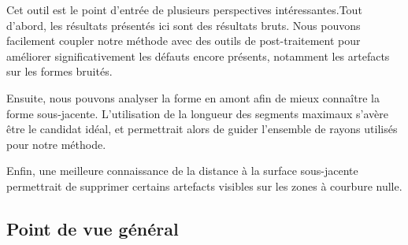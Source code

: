Cet outil est le point d'entrée de plusieurs perspectives intéressantes.Tout
d'abord, les résultats présentés ici sont des résultats bruts. Nous pouvons
facilement coupler notre méthode avec des outils de post-traitement pour
améliorer significativement les défauts encore présents, notamment les artefacts
sur les formes bruités.


Ensuite, nous pouvons analyser la forme en amont afin de mieux connaître la
forme sous-jacente. L'utilisation de la longueur des segments maximaux s'avère
être le candidat idéal, et permettrait alors de guider l'ensemble de rayons
utilisés pour notre méthode.


Enfin, une meilleure connaissance de la distance à la surface sous-jacente
permettrait de supprimer certains artefacts visibles sur les zones à courbure
nulle.
%
\subsection*{Point de vue général}

%
%
%
%
%

